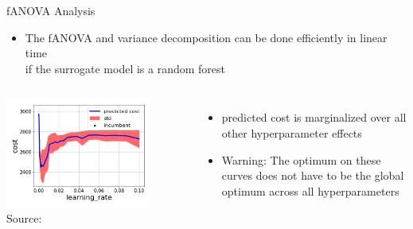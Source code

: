 \begin{frame}[c,fragile]{fANOVA Analysis}

\begin{itemize}
	\item The fANOVA and variance decomposition can be done efficiently in linear time\\
	 if the surrogate model is a random forest~
	\pause
\end{itemize}

\begin{columns}
	
	\begin{center}
	\includegraphics[width=0.8\textwidth]{images/learning_rate_fanova.png}\\
	Source: 
	\end{center}
	
	
	\begin{itemize}
		\item predicted cost is marginalized over all other hyperparameter effects
		\pause
		\item \alert{Warning}: The optimum on these curves does not have to be the global optimum across all hyperparameters
	\end{itemize}
\end{columns}



\end{frame}


